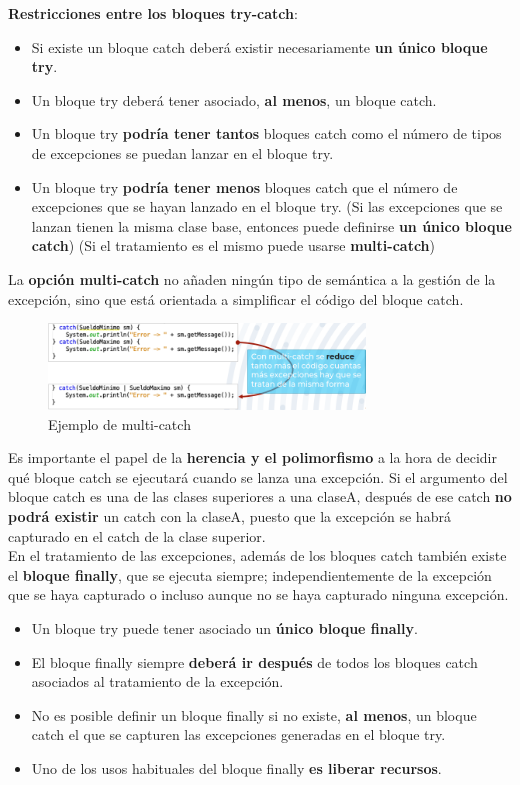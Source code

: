 \documentclass{article}
\begin{document}
\newpage

\textbf{Restricciones entre los bloques try-catch}:

\begin{itemize}
    \item Si existe un bloque catch deberá existir necesariamente \textbf{un único bloque try}.
    \item Un bloque try deberá tener asociado, \textbf{al menos}, un bloque catch.
    \item Un bloque try \textbf{podría tener tantos} bloques catch como el número
    de tipos de excepciones se puedan lanzar en el bloque try.
    \item Un bloque try \textbf{podría tener menos} bloques catch que el número
    de excepciones que se hayan lanzado en el bloque try. (Si las excepciones que se lanzan tienen la misma clase base, entonces puede definirse \textbf{un único bloque catch}) (Si el tratamiento es el mismo puede usarse \textbf{multi-catch})
\end{itemize}

La \textbf{opción multi-catch} no añaden ningún tipo de semántica a la gestión de la excepción, sino que está orientada a simplificar el código del bloque catch.

\begin{figure}[h]
    \centering
    \includegraphics[width=0.75\textwidth]{img-t7/img_752_17.png}
    \caption{Ejemplo de multi-catch}
\end{figure}

Es importante el papel de la \textbf{herencia y el polimorfismo} a la hora de decidir qué bloque catch se ejecutará cuando se lanza una excepción. Si el argumento del bloque catch es una de las clases superiores a una claseA, después de ese catch \textbf{no podrá existir} un catch con la claseA, puesto que la excepción se habrá capturado en el catch de la clase superior. \\

En el tratamiento de las excepciones, además de los bloques catch también existe el \textbf{bloque finally}, que se ejecuta siempre; independientemente de la excepción que se haya capturado o incluso aunque no se haya capturado ninguna excepción.
\begin{itemize}
    \item Un bloque try puede tener asociado un \textbf{único bloque finally}.
    \item El bloque finally siempre \textbf{deberá ir después} de todos los bloques catch asociados al tratamiento de la excepción.
    \item No es posible definir un bloque finally si no existe, \textbf{al menos}, un bloque catch el que se capturen las excepciones generadas en el bloque try.
    \item Uno de los usos habituales del bloque finally \textbf{es liberar recursos}.
\end{itemize}
\end{document}
